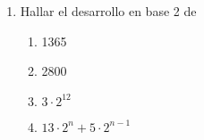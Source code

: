 \ejercicio
\begin{enumerate}[label=\roman*)]
	\item Hallar el desarrollo en base 2 de
	      \begin{enumerate}[label=(\alph*)]
		      \item 1365
		      \item 2800
		      \item $3\cdot 2^{12}$
		      \item $13 \cdot 2^n + 5 \cdot 2^{n-1}$
	      \end{enumerate}
\end{enumerate}

\separadorCorto
\Hacer
